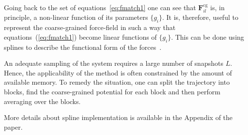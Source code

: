 Going back to the set of equations~\ref{eq:fmatch1} one can see that ${\bm F}_{il}^\text{cg}$ is, in principle, a non-linear function of its parameters $\{g_i\}$. It is, therefore, useful to represent the coarse-grained force-field in such a way that equations~(\ref{eq:fmatch1}) become linear functions of $\{g_i\}$. This can be done using splines to describe the functional form of the forces~\cite{Izvekov:2005}.

An adequate sampling of the system requires a large number of snapshots $L$. Hence, the applicability of the method is often constrained by the amount of available memory. To remedy the situation, one can split the trajectory into blocks, find the coarse-grained potential for each block and then perform averaging over the blocks. 

More details about spline implementation is available in the Appendix of the \votca paper.
